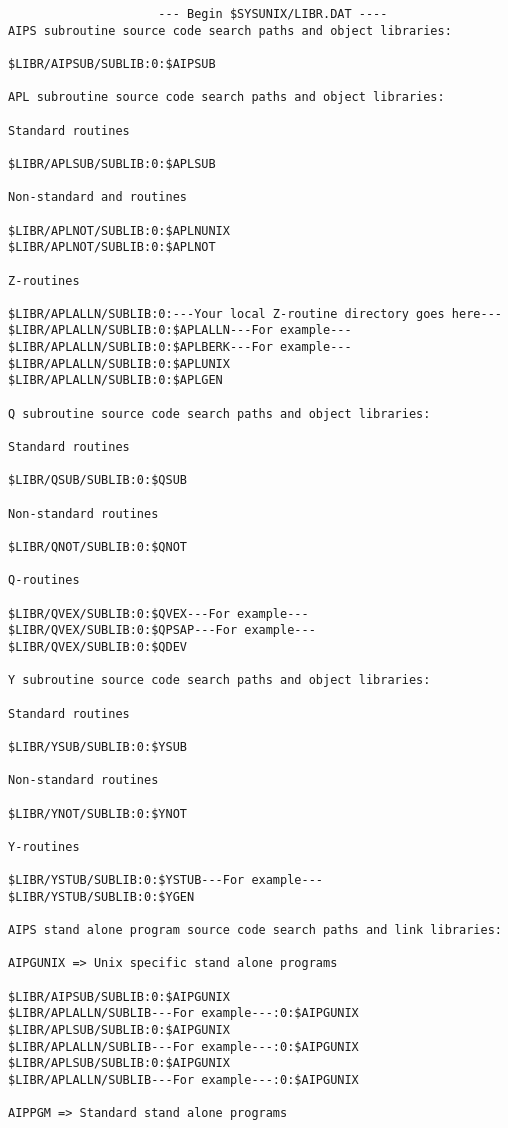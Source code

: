 \begin{verbatim}
                     --- Begin $SYSUNIX/LIBR.DAT ----
AIPS subroutine source code search paths and object libraries:

$LIBR/AIPSUB/SUBLIB:0:$AIPSUB

APL subroutine source code search paths and object libraries:

Standard routines

$LIBR/APLSUB/SUBLIB:0:$APLSUB

Non-standard and routines

$LIBR/APLNOT/SUBLIB:0:$APLNUNIX
$LIBR/APLNOT/SUBLIB:0:$APLNOT

Z-routines

$LIBR/APLALLN/SUBLIB:0:---Your local Z-routine directory goes here---
$LIBR/APLALLN/SUBLIB:0:$APLALLN---For example---
$LIBR/APLALLN/SUBLIB:0:$APLBERK---For example---
$LIBR/APLALLN/SUBLIB:0:$APLUNIX
$LIBR/APLALLN/SUBLIB:0:$APLGEN

Q subroutine source code search paths and object libraries:

Standard routines

$LIBR/QSUB/SUBLIB:0:$QSUB

Non-standard routines

$LIBR/QNOT/SUBLIB:0:$QNOT

Q-routines

$LIBR/QVEX/SUBLIB:0:$QVEX---For example---
$LIBR/QVEX/SUBLIB:0:$QPSAP---For example---
$LIBR/QVEX/SUBLIB:0:$QDEV

Y subroutine source code search paths and object libraries:

Standard routines

$LIBR/YSUB/SUBLIB:0:$YSUB

Non-standard routines

$LIBR/YNOT/SUBLIB:0:$YNOT

Y-routines

$LIBR/YSTUB/SUBLIB:0:$YSTUB---For example---
$LIBR/YSTUB/SUBLIB:0:$YGEN

AIPS stand alone program source code search paths and link libraries:

AIPGUNIX => Unix specific stand alone programs

$LIBR/AIPSUB/SUBLIB:0:$AIPGUNIX
$LIBR/APLALLN/SUBLIB---For example---:0:$AIPGUNIX
$LIBR/APLSUB/SUBLIB:0:$AIPGUNIX
$LIBR/APLALLN/SUBLIB---For example---:0:$AIPGUNIX
$LIBR/APLSUB/SUBLIB:0:$AIPGUNIX
$LIBR/APLALLN/SUBLIB---For example---:0:$AIPGUNIX

AIPPGM => Standard stand alone programs


\end{verbatim}
